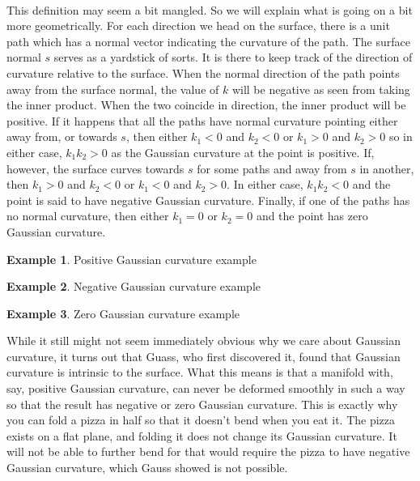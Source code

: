 \documentclass[]{article}
\newcommand\<{\ensuremath{\left\langle}}
\renewcommand\>{\ensuremath{\right\rangle}}
\theoremstyle{definition}
\theoremstyle{definition}
\newtheorem{example}{Example}[section]
\begin{document}
	\\
	This definition may seem a bit mangled. So we will explain what is going on a bit more geometrically. For each direction we head on the surface, there is a unit path which has a normal vector indicating the curvature of the path. The surface normal $s$ serves as a yardstick of sorts. It is there to keep track of the direction of curvature relative to the surface. When the normal direction of the path points away from the surface normal, the value of $k$ will be negative as seen from taking the inner product. When the two coincide in direction, the inner product will be positive. If it happens that all the paths have normal curvature pointing either away from, or towards $s$, then either $k_1 < 0$ and $k_2 < 0$ or $k_1 > 0$ and $k_2 > 0$ so in either case, $k_1k_2 > 0$ as the Gaussian curvature at the point is positive. If, however, the surface curves towards $s$ for some paths and away from $s$ in another, then $k_1 > 0$ and $k_2 < 0$ or $k_1 < 0$ and $k_2 > 0$. In either case, $k_1k_2 < 0$ and the point is said to have negative Gaussian curvature. Finally, if one of the paths has no normal curvature, then either $k_1 = 0$ or $k_2 = 0$ and the point has zero Gaussian curvature.
	\begin{example}
		Positive Gaussian curvature example
	\end{example}
	\begin{example}
		Negative Gaussian curvature example
	\end{example}
	\begin{example}
		Zero Gaussian curvature example
	\end{example}
	
	While it still might not seem immediately obvious why we care about Gaussian curvature, it turns out that Guass, who first discovered it, found that Gaussian curvature is intrinsic to the surface. What this means is that a manifold with, say, positive Gaussian curvature, can never be deformed smoothly in such a way so that the result has negative or zero Gaussian curvature. This is exactly why you can fold a pizza in half so that it doesn't bend when you eat it. The pizza exists on a flat plane, and folding it does not change its Gaussian curvature. It will not be able to further bend for that would require the pizza to have negative Gaussian curvature, which Gauss showed is not possible.
	
\end{document}
